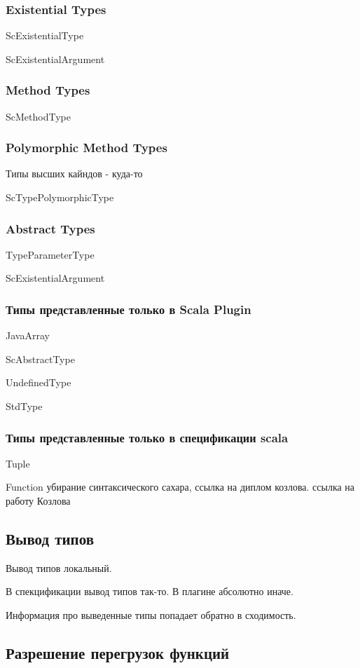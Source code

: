 \subsubsection{Existential Types}
ScExistentialType

ScExistentialArgument

\subsubsection{Method Types}

ScMethodType

\subsubsection{Polymorphic Method Types}
Типы высших кайндов - куда-то

ScTypePolymorphicType


\subsubsection{Abstract Types}

TypeParameterType

ScExistentialArgument

\subsubsection{Типы представленные только в Scala Plugin}
JavaArray

ScAbstractType

UndefinedType

StdType
\subsubsection{Типы представленные только в спецификации scala}
Tuple

Function
убирание синтаксического сахара, ссылка на диплом козлова.
ссылка на работу Козлова


\subsection{Вывод типов}
\label{sec:infer}

Вывод типов локальный.

В спекцификации вывод типов так-то.
В плагине абсолютно иначе.

Информация про выведенные типы попадает обратно в сходимость.

\subsection{Разрешение перегрузок функций}
\label{sec:overloading}
